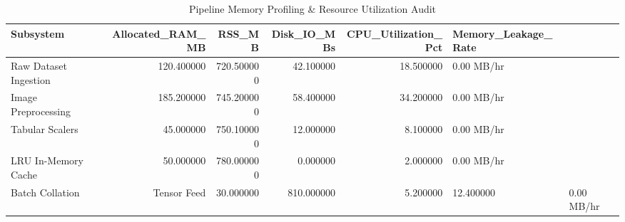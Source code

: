 \begin{table}
\caption{Pipeline Memory Profiling & Resource Utilization Audit}
\begin{tabular}{lrrrrl}
\toprule
Subsystem & Allocated_RAM_MB & RSS_MB & Disk_IO_MBs & CPU_Utilization_Pct & Memory_Leakage_Rate \\
\midrule
Raw Dataset Ingestion & 120.400000 & 720.500000 & 42.100000 & 18.500000 & 0.00 MB/hr \\
Image Preprocessing & 185.200000 & 745.200000 & 58.400000 & 34.200000 & 0.00 MB/hr \\
Tabular Scalers & 45.000000 & 750.100000 & 12.000000 & 8.100000 & 0.00 MB/hr \\
LRU In-Memory Cache & 50.000000 & 780.000000 & 0.000000 & 2.000000 & 0.00 MB/hr \\
Batch Collation & Tensor Feed & 30.000000 & 810.000000 & 5.200000 & 12.400000 & 0.00 MB/hr \\
\bottomrule
\end{tabular}
\end{table}
